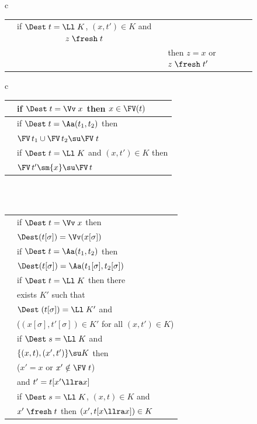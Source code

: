 \begin{figure}
{\begin{tabular}{c}
\begin{tabular}{|c|l|}
	if $\Dest\;t = \Ll\;K$, $(x,t')\in K$ and $z\;\fresh\;t$
	\\& then $z = x$ or $z\;\fresh\;t'$
	\\\hline
\end{tabular}
\end{tabular} 
\hspace*{-0.9ex}
\begin{tabular}{c}
	\vspace*{-1.5ex}
	\begin{tabular}{|c|l|}	
		\hline 
		\textrm{\IFvVr} & 
		if $\Dest\;t = \Vv\;x$ then $x \in \FV(t)$
		\\\hline
		\textrm{\IFvAp} &
		if $\Dest\;t = \Aa(t_1,t_2)$ then
		\\&  
		$\FV\,t_1 \cup \FV\,t_2 \su \FV\;t$  
		\\\hline
		\textrm{\IFvLm}  &
		if $\Dest\;t = \Ll\;K$ and $(x,t') \in K$ then
		\\&  
		$\FV\,t' \sm \{x\} \su \FV\,t$ 
		\\\hline
	\end{tabular}
\\ \\ \vspace*{-1.5ex}
	\begin{tabular}{|c|l|}	
		\hline
		\textrm{\IPmVr} 
		&
		if $\Dest\;t = \Vv\;x$ then 
		\\&
		$\Dest(t[\sigma]) = \Vv (x[\sigma])$
		\\\hline
		\textrm{\IPmAp} 
		&
		if $\Dest\;t = \Aa(t_1,t_2)$ then 
		\\&
		$\Dest(t[\sigma]) = \Aa(t_1[\sigma],t_2[\sigma])$
		\\\hline
		\textrm{\IPmLm} 
		&
		if $\Dest\;t = \Ll\;K$ then there 
		\\& exists $K'$ 
		such that 
				\\&
				$\Dest\;(t[\sigma]) = \Ll\;K'$ and 
		\\&
		($(x[\sigma],t'[\sigma]) \in K'$ 
		for all 
		$(x,t') \in K$)
		\\\hline
		\textrm{\IPmBvr} 
		&
		if $\Dest\;s = \Ll\;K$ and 
		\\& $\{(x,t),(x',t')\} \su K$
		then 
		\\&($x' = x$ or $x'\notin\FV\;t$) 
		\\& and $t' = t[x'  \llra x]$
				\\\hline
	 	\textrm{\IIPmBvr}  &	
		if $\Dest\;s = \Ll\;K$,  
		$(x,t) \in K$ and 
		\\
		&
		$x'\;\fresh\;t$ then $(x',t[x \llra x]) \in K$

\end{tabular}
\end{tabular}}
\end{figure}
